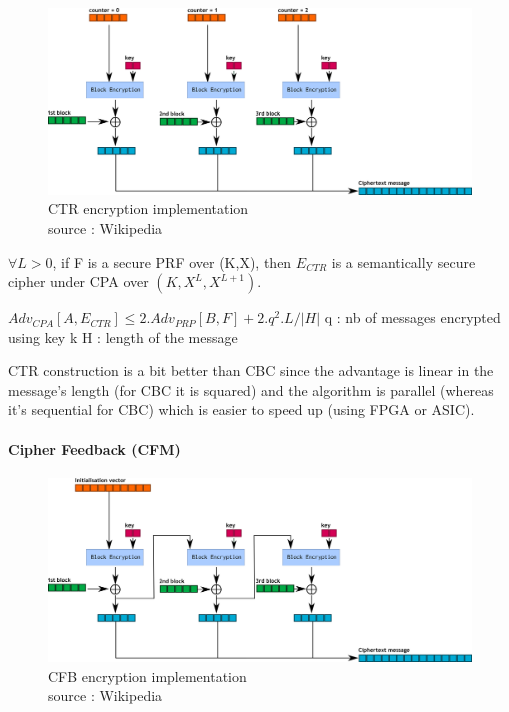 \begin{figure}[h!]
    \centering
       \includegraphics[width=\textwidth]{images/CTR.png}
	\caption{CTR encryption implementation \\ source : Wikipedia}
	\label{fig:CTR_encryption_impl}
\end{figure}

\begin{mytheorem}

$\forall L>0$, if F is a secure PRF over (K,X), then $E_{CTR}$ is a semantically secure cipher under CPA over $(K,X^L,X^{L+1})$.

$Adv_{CPA}[A,E_{CTR}] \leq 2.Adv_{PRP}[B,F] + 2.q^2.L/|H| $
q : nb of messages encrypted using key k
H : length of the message
\end{mytheorem}

CTR construction is a bit better than CBC since the advantage is linear in the message's length (for CBC it is squared) and the algorithm is parallel (whereas it's sequential for CBC) which is easier to speed up (using FPGA or ASIC).


\paragraph{ Cipher Feedback (CFM) }

\begin{figure}[h!]
    \centering
       \includegraphics[width=\textwidth]{images/CFB.png}
	\caption{CFB encryption implementation \\ source : Wikipedia}
	\label{fig:CFB_encryption_impl}
\end{figure}

